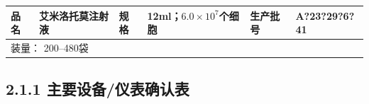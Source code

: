 \documentclass[UTF8,10pt,a4paper,fontset=fandol]{ctexart}
\newcommand{\fieldvalue}[1]{#1}
\newcommand{\handwritten}[1]{#1}
\begin{document}
\noindent
\begin{tabularx}{\textwidth}{|l|X|l|X|l|X|}
\hline
品名 &
\fieldvalue{艾米洛托莫注射液} &
规格 &
\fieldvalue{12ml；$6.0\times10^{7}$个细胞} &
生产批号 &
\fieldvalue{\handwritten{A?23?29?6?41}} \\
\hline
\multicolumn{5}{|l|}{装量：%
\fieldvalue{200--480袋}} \\
\hline
\end{tabularx}

\subsection*{2.1.1 主要设备/仪表确认表}
\end{document}
